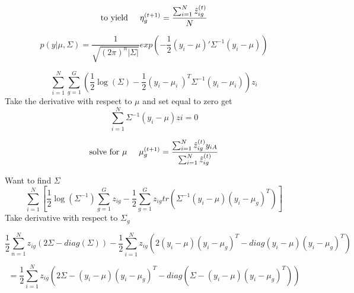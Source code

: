 \documentclass[a4paper,12pt]{article}\usepackage[]{graphicx}\usepackage[]{color}
\begin{document}
\[
\text{to yield} \hspace{5mm} \eta_g^{\left(t+1\right)} = \frac{\sum_{i=1}^{N} \hat{z}_{ig}^{\left(t\right)}}{N}
\]


\begin{equation}
 p(y|\mu,\Sigma)=\frac{1}{\sqrt{(2\pi)^{n}|\Sigma|}}exp(-\frac{1}{2}(y_{i}-\mu)'\Sigma^{-1}(y_{i}-\mu))
\end{equation}
 \noindent{}

\begin{equation}
\sum_{i=1}^{N} \sum_{g=1}^{G} \left(\frac{1}{2}\log\left(\Sigma \right)-\frac{1}{2}\left(y_i - \mu_i\ \right)^T\Sigma^{-1}\left(y_i-\mu_i \right) \right)z_i
\end{equation}
Take the derivative with respect to $\mu$ and set equal to zero get
\begin{equation}
\sum_{i=1}^{N}\Sigma^{-1}\left(y_i-\mu \right)zi=0
\end{equation}

\begin{equation}
\text{solve for $\mu$} \hspace{5mm}  \mu_g^{\left(t+1\right)} = \frac{\sum_{i=1}^{N} \hat{z}_{ig}^{\left(t \right)} y_{iA}}{\sum_{i=1}^{N} \hat{z}_{ig}^{\left(t \right)}}\\
\end{equation}

Want to find $\Sigma$
\begin{equation}
\sum_{i=1}^N \left[\frac{1}{2}\log \left(\Sigma^{-1} \right) \sum_{g=1}^{G} z_{ig} - \frac{1}{2}\sum_{g=1}^{G}z_{ig}tr\left(\Sigma^{-1} \left(y_i-\mu \right)\left(y_i-\mu_g \right)^T \right)  \right]
\end{equation}
Take derivative with respect to $\Sigma_{g}$

\begin{equation}
\frac{1}{2}\sum_{n=1}^{N} z_{ig} \left(2\Sigma-diag\left(\Sigma \right) \right) - \frac{1}{2}\sum_{i=1}^N z_{ig}\left(2 \left(y_i-\mu \right)\left(y_i-\mu_g \right)^T - diag\left(y_i-\mu \right)\left(y_i-\mu_g \right)^T\right) 
\end{equation}

\begin{equation}
=\frac{1}{2}\sum_{i=1}^{N} z_{ig} \left(2\Sigma - \left(y_i-\mu \right)\left(y_i-\mu_g \right)^T - diag\left(\Sigma - \left(y_i-\mu \right)\left(y_i-\mu_g \right)^T \right)  \right)
\end{equation}
\end{document}
